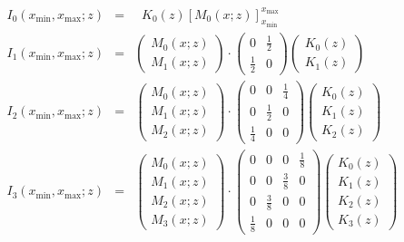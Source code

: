 \documentclass[a4paper,10pt,twosided]{article}
\begin{document}
\begin{eqnarray*}
     I_0(x_\mathrm{min},x_\mathrm{max};z) &=&  \;\; K_0(z) \left[ M_0(x;z) \right]_{x_\mathrm{min}}^{x_\mathrm{max}}
\\   I_1(x_\mathrm{min},x_\mathrm{max};z) &=&  
       \left(\begin{array}{c} M_0(x;z) \\ M_1(x;z)   \end{array}\right)
\cdot \left(\begin{array}{cc}
                   0  & \frac{1}{2} 
               \\  \frac{1}{2}  & 0 
               \end{array}\right) 
       \left(\begin{array}{c} K_0(z) \\ K_1(z)  \end{array} \right) 
\\   I_2(x_\mathrm{min},x_\mathrm{max};z) &=& 
       \left(\begin{array}{c} M_0(x;z) \\ M_1(x;z) \\ M_2(x;z)  \end{array}\right)
\cdot \left(\begin{array}{ccc}
                   0  & 0 & \frac{1}{4}  
               \\  0  & \frac{1}{2} & 0  
               \\  \frac{1}{4}  & 0 & 0  
               \end{array}\right) 
       \left(\begin{array}{c} K_0(z) \\ K_1(z) \\ K_2(z)  \end{array} \right) 
\\   I_3(x_\mathrm{min},x_\mathrm{max};z) &=&
       \left(\begin{array}{c} M_0(x;z) \\ M_1(x;z) \\ M_2(x;z) \\ M_3(x;z) \end{array}\right)
\cdot \left(\begin{array}{cccc}
                   0  & 0 & 0  &  \frac{1}{8}
               \\  0  & 0 & \frac{3}{8}  &  0
               \\  0  & \frac{3}{8} & 0  &  0
               \\  \frac{1}{8}  & 0 & 0  &  0
               \end{array}\right) 
       \left(\begin{array}{c} K_0(z) \\ K_1(z) \\ K_2(z) \\ K_3(z) \end{array} \right) 
\end{eqnarray*}
\end{document}

